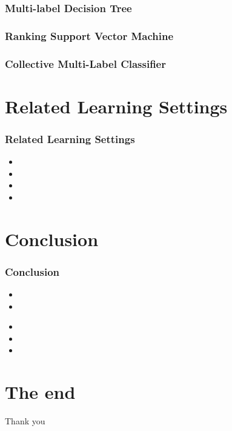 \documentclass{beamer}
\begin{document}
\begin{frame}
\frametitle{Multi-label Decision Tree}

\end{frame}
\begin{frame}
\frametitle{Ranking Support Vector Machine}

\end{frame}
\begin{frame}
\frametitle{Collective Multi-Label Classifier}

\end{frame}
\section{Related Learning Settings}

\begin{frame}
\frametitle{Related Learning Settings}
\begin{itemize}
\item 
\item 
\item 
\item 
\end{itemize}
\end{frame}

\section{Conclusion}
\begin{frame}
\frametitle{Conclusion}
\begin{itemize}
\item 
\item 
\end{itemize}
\begin{itemize}
\item <5-> 
\item <6->
\item <7-> 
\end{itemize}
\end{frame}

\section{The end}
\begin{frame}
\Huge{\centerline{Thank you}}
\end{frame}

\end{document}
